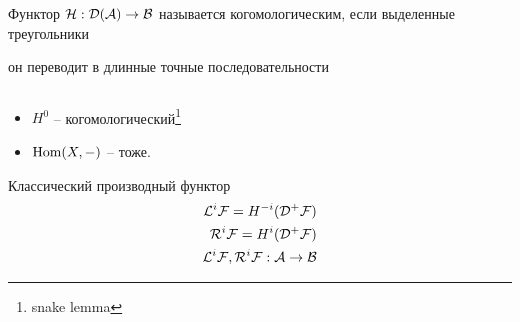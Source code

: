 \documentclass[../hw_main.tex]{subfiles}
\begin{document}
 \begin{to_def}
Функтор $\mathcal{H}: \mathcal{D(A)}\rightarrow\mathcal{B}$ называется когомологическим, если выделенные треугольники  он переводит в длинные точные последовательности
\end{to_def}
\begin{to_ex}
$ $
\begin{itemize}
    \item $H^0$ -- когомологический\footnote{snake lemma}
    \item $\operatorname{Hom}(X, -)$ -- тоже.
\end{itemize}
\end{to_ex}
 \begin{to_def}
 \label{classicDerFunc}
Классический производный функтор 
\begin{align*}
    \mathcal{L}^{i}\mathcal{F} = H^{-i}(\mathcal{D^+ F})\\
    \mathcal{R}^{i}\mathcal{F} = H^{i}(\mathcal{D^+ F})\\
    \mathcal{L}^{i}\mathcal{F}, \mathcal{R}^{i}\mathcal{F}: \mathcal{A} \rightarrow \mathcal{B}
\end{align*}
\end{to_def}
\end{document}
